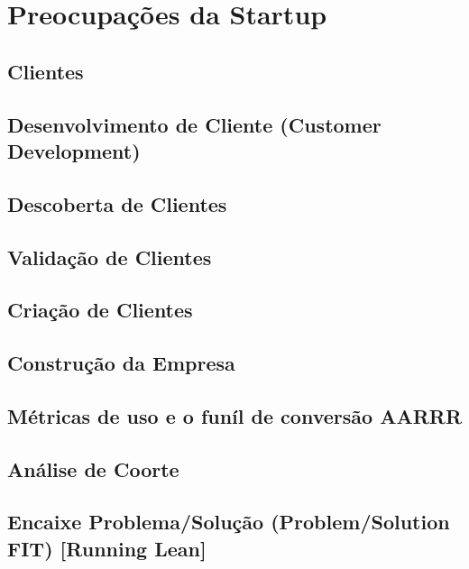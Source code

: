\section{Preocupações da Startup}

\subsection{Clientes}
\subsection{Desenvolvimento de Cliente (Customer Development)}
\subsection{Descoberta de Clientes}
\subsection{Validação de Clientes}
\subsection{Criação de Clientes}
\subsection{Construção da Empresa}
\subsection{Métricas de uso e o funíl de conversão AARRR}
\subsection{Análise de Coorte}
\subsection{Encaixe Problema/Solução (Problem/Solution FIT) [Running Lean]}
